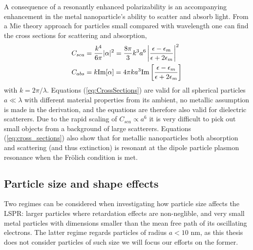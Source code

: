 A consequence of a resonantly enhanced polarizability is an accompanying enhancement in the metal nanoparticle's ability to scatter and absorb light. From a Mie theory approach for particles small compared with wavelength one can find the cross sections for scattering and absorption\cite{BH},
\begin{subequations}
    \label{eq:cross_sections}
    \begin{align}
        C_{sca} &= \frac{k^4}{6\pi}|\alpha|^2 = \frac{8\pi}{3} k^3 a^6 \left|  \frac{\epsilon-\epsilon_m}{\epsilon+2\epsilon_m}  \right|^2 \\
        C_{abs} &= k\text{Im}[\alpha] = 4 \pi k a^3 \text{Im}\left[ \frac{\epsilon-\epsilon_m}{\epsilon+2\epsilon_m} \right]
    \end{align}
    \label{eq:CrossSections}
\end{subequations}
with $k=2\pi/\lambda$. Equations (\ref{eq:CrossSections}) are valid for all spherical particles $a\ll\lambda$ with different material properties from its ambient, no metallic assumption is made in the derivation, and the equations are therefore also valid for dielectric scatterers. Due to the rapid scaling of $C_{sca} \propto a^6$ it is very difficult to pick out small objects from a background of large scatterers. Equations (\ref{eq:cross_sections}) also show that for metallic nanoparticles both absorption and scattering (and thus extinction) is resonant at the dipole particle plasmon resonance when the Frölich condition is met. 

\subsection{Particle size and shape effects}
Two regimes can be considered when investigating how particle size affects the LSPR: larger particles where retardation effects are non-neglible, and very small metal particles with dimensions smaller than the mean free path of its oscillating electrons. The latter regime regards particles of radius $a<10$ nm\cite{maier}, as this thesis does not consider particles of such size we will focus our efforts on the former.

